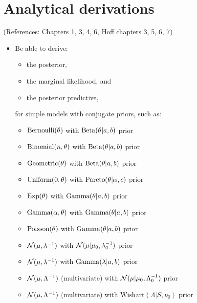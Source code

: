 \documentclass[12pt]{article}
\begin{document}
\section{Analytical derivations}
(References: Chapters 1, 3, 4, 6, Hoff chapters 3, 5, 6, 7)
\begin{itemize}
\setlength\itemsep{0em}
\item Be able to derive:
\begin{itemize}
\item the posterior,
\item the marginal likelihood, and
\item the posterior predictive,
\end{itemize}
for simple models with conjugate priors, such as:
\begin{itemize}
\item $\operatorname*{Bernoulli}(\theta)$ with $\operatorname*{Beta}(\theta|a, b)$ prior
\item $\operatorname*{Binomial}(n,\theta)$ with $\operatorname*{Beta}(\theta|a, b)$ prior
\item $\operatorname*{Geometric}(\theta)$ with $\operatorname*{Beta}(\theta|a, b)$ prior
\item $\operatorname*{Uniform}(0,\theta)$ with $\operatorname*{Pareto}(\theta|\alpha,c)$ prior
\item $\operatorname*{Exp}(\theta)$ with $\operatorname*{Gamma}(\theta|a, b)$ prior
\item $\operatorname*{Gamma}(\alpha,\theta)$ with $\operatorname*{Gamma}(\theta|a, b)$ prior
\item $\operatorname*{Poisson}(\theta)$ with $\operatorname*{Gamma}(\theta|a, b)$ prior
\item $\mathcal{N}(\mu,\lambda^{-1})$ with $\mathcal{N}(\mu|\mu_0,\lambda_0^{-1})$ prior
\item $\mathcal{N}(\mu,\lambda^{-1})$ with $\operatorname*{Gamma}(\lambda|a,b)$ prior
\item $\mathcal{N}(\mu,\Lambda^{-1})$ (multivariate) with $\mathcal{N}(\mu|\mu_0,\Lambda_0^{-1})$ prior
\item $\mathcal{N}(\mu,\Lambda^{-1})$ (multivariate) with $\mathrm{Wishart}(\Lambda|S,\nu_0)$ prior
\end{itemize}
\end{itemize}
\end{document}
